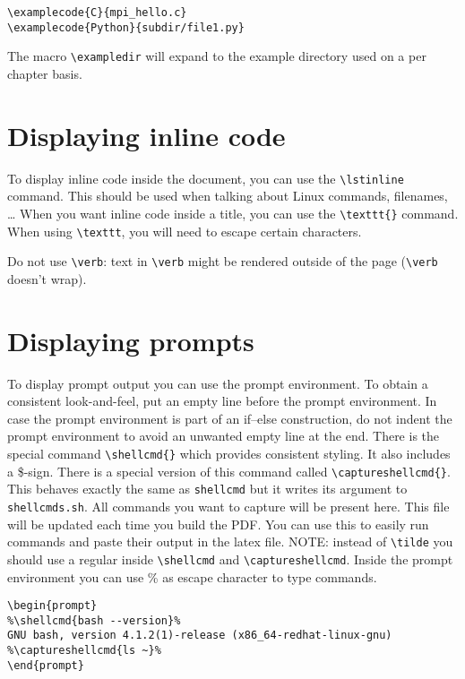 \documentclass[11pt,a4paper]{article}
\begin{document}
\begin{verbatim}
\examplecode{C}{mpi_hello.c}
\examplecode{Python}{subdir/file1.py}
\end{verbatim}


The macro \lstinline|\exampledir| will expand to the example directory used on a per
chapter basis.

\section{Displaying inline code}
\label{sec:displaying-inline-code}

To display inline code inside the document, you can use the \lstinline|\lstinline| command.
This should be used when talking about Linux commands, filenames, \ldots
When you want inline code inside a title, you can use the \lstinline|\texttt{}| command.
When using \lstinline|\texttt|, you will need to escape certain characters.

Do not use \lstinline|\verb|: text in \lstinline|\verb| might be rendered outside of the
page (\lstinline|\verb| doesn't wrap).

\section{Displaying prompts}
\label{sec:displaying-prompts}

To display prompt output you can use the prompt environment. To obtain a
consistent look-and-feel, put an empty line before the prompt environment.  In
case the prompt environment is part of an if--else construction, do not indent
the prompt environment to avoid an unwanted empty line at the end.  There
is the special command \lstinline|\shellcmd{}| which provides consistent styling. It
also includes a \$-sign. There is a special version of this command called
\lstinline|\captureshellcmd{}|. This behaves exactly the same as \lstinline|shellcmd| but
it writes its argument to \lstinline|shellcmds.sh|. All commands you want to capture
will be present here. This file will be updated each time you build the PDF.
You can use this to easily run commands and paste their output in the latex
file. NOTE: instead of \lstinline|\tilde| you should use a regular \tilde{} inside
\lstinline|\shellcmd| and \lstinline|\captureshellcmd|. Inside the prompt environment you
can use \% as escape character to type commands.

\begin{verbatim}
\begin{prompt}
%\shellcmd{bash --version}%
GNU bash, version 4.1.2(1)-release (x86_64-redhat-linux-gnu)
%\captureshellcmd{ls ~}%
\end{prompt}
\end{verbatim}
\end{document}
